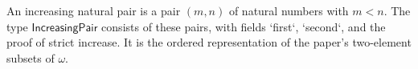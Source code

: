 \begin{definition}
An increasing natural pair is a pair $(m,n)$ of natural numbers with
$m<n$.  The type $\mathsf{IncreasingPair}$ consists of these pairs, with
fields `first`, `second`, and the proof of strict increase.  It is the
ordered representation of the paper's two-element subsets of $\omega$.
\end{definition}
